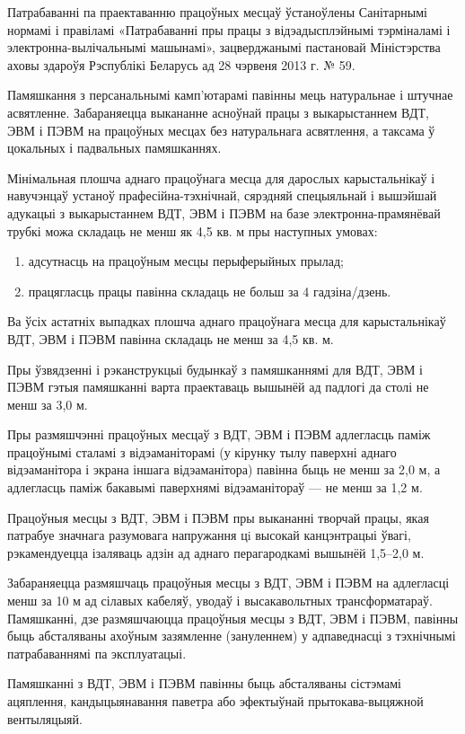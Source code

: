 Патрабаванні па праектаванню працоўных месцаў ўстаноўлены Санітарнымі нормамі і правіламі «Патрабаванні пры працы з відэадысплэйнымі тэрміналамі і электронна-вылічальнымі машынамі», зацверджанымі пастановай Міністэрства аховы здароўя Рэспублікі Беларусь ад 28 чэрвеня 2013 г. № 59.

Памяшкання з персанальнымі камп'ютарамі павінны мець натуральнае і штучнае асвятленне. Забараняецца выкананне асноўнай працы з выкарыстаннем ВДТ, ЭВМ і ПЭВМ на працоўных месцах без натуральнага асвятлення, а таксама ў цокальных і падвальных памяшканнях.

Мінімальная плошча аднаго працоўнага месца для дарослых карыстальнікаў і навучэнцаў устаноў прафесійна-тэхнічнай, сярэдняй спецыяльнай і вышэйшай адукацыі з выкарыстаннем ВДТ, ЭВМ і ПЭВМ на базе электронна-прамянёвай трубкі можа складаць не менш як 4,5 кв. м пры наступных умовах:
\begin{enumerate}
    \item адсутнасць на працоўным месцы перыферыйных прылад;
    \item працягласць працы павінна складаць не больш за 4 гадзіна/дзень.
\end{enumerate}

Ва ўсіх астатніх выпадках плошча аднаго працоўнага месца для карыстальнікаў ВДТ, ЭВМ і ПЭВМ павінна складаць не менш за 4,5 кв. м.

Пры ўзвядзенні і рэканструкцыі будынкаў з памяшканнямі для ВДТ, ЭВМ і ПЭВМ гэтыя памяшканні варта праектаваць вышынёй ад падлогі да столі не менш за 3,0 м.

Пры размяшчэнні працоўных месцаў з ВДТ, ЭВМ і ПЭВМ адлегласць паміж працоўнымі сталамі з відэаманіторамі (у кірунку тылу паверхні аднаго відэаманітора і экрана іншага відэаманітора) павінна быць не менш за 2,0 м, а адлегласць паміж бакавымі паверхнямі відэаманітораў --- не менш за 1,2 м.

Працоўныя месцы з ВДТ, ЭВМ і ПЭВМ пры выкананні творчай працы, якая патрабуе значнага разумовага напружання цi высокай канцэнтрацыі ўвагі, рэкамендуецца ізаляваць адзін ад аднаго перагародкамі вышынёй 1,5--2,0 м.

Забараняецца размяшчаць працоўныя месцы з ВДТ, ЭВМ і ПЭВМ на адлегласці менш за 10 м ад сілавых кабеляў, уводаў і высакавольтных трансформатараў. Памяшканні, дзе размяшчаюцца працоўныя месцы з ВДТ, ЭВМ і ПЭВМ, павінны быць абсталяваны ахоўным зазямленне (зануленнем) у адпаведнасці з тэхнічнымі патрабаваннямі па эксплуатацыі.

Памяшканні з ВДТ, ЭВМ і ПЭВМ павінны быць абсталяваны сістэмамі ацяплення, кандыцыянавання паветра або эфектыўнай прытокава-выцяжной вентыляцыяй.

